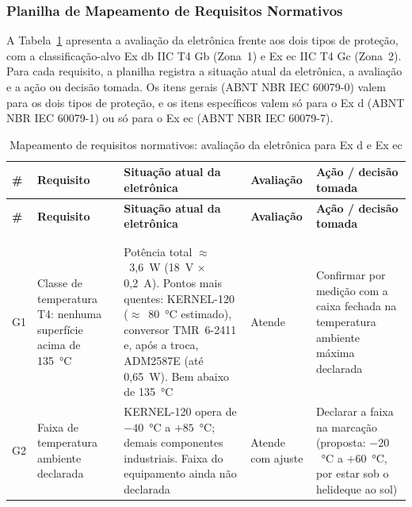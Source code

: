 \documentclass[a4paper, 12pt]{article}
\newcommand{\avA}{\cellcolor{green!20}Atende}
\newcommand{\avJ}{\cellcolor{yellow!30}Atende com ajuste}
\begin{document}
\subsubsection{Planilha de Mapeamento de Requisitos Normativos}\label{sec:planilha}

A Tabela~\ref{tab:gap} apresenta a avaliação da eletrônica frente aos dois tipos de proteção, com a classificação-alvo Ex db IIC T4 Gb (Zona~1) e Ex ec IIC T4 Gc (Zona~2). Para cada requisito, a planilha registra a situação atual da eletrônica, a avaliação e a ação ou decisão tomada. Os itens gerais (ABNT NBR IEC 60079-0) valem para os dois tipos de proteção, e os itens específicos valem só para o Ex d (ABNT NBR IEC 60079-1) ou só para o Ex ec (ABNT NBR IEC 60079-7).

{\footnotesize
\renewcommand{\arraystretch}{1.25}
\begin{longtable}{|>{\centering\arraybackslash}p{0.6cm}|>{\raggedright\arraybackslash}p{2.8cm}|>{\raggedright\arraybackslash}p{4.0cm}|>{\raggedright\arraybackslash}p{1.7cm}|>{\raggedright\arraybackslash}p{4.2cm}|}
    \caption{Mapeamento de requisitos normativos: avaliação da eletrônica para Ex d e Ex ec}\label{tab:gap}\\
    \hline
    \textbf{\#} & \centering\arraybackslash\textbf{Requisito} & \centering\arraybackslash\textbf{Situação atual da eletrônica} & \centering\arraybackslash\textbf{Avaliação} & \centering\arraybackslash\textbf{Ação / decisão tomada} \\ \hline
    \endfirsthead
    \hline
    \textbf{\#} & \centering\arraybackslash\textbf{Requisito} & \centering\arraybackslash\textbf{Situação atual da eletrônica} & \centering\arraybackslash\textbf{Avaliação} & \centering\arraybackslash\textbf{Ação / decisão tomada} \\ \hline
    \endhead
    \multicolumn{5}{r}{\textit{continua na próxima página}} \\
    \endfoot
    \endlastfoot
    \multicolumn{5}{|l|}{\textbf{Requisitos gerais (valem para Ex d e Ex ec) --- ABNT NBR IEC 60079-0}} \\ \hline
    G1 & Classe de temperatura T4: nenhuma superfície acima de 135~°C & Potência total $\approx$~3,6~W (18~V $\times$ 0,2~A). Pontos mais quentes: KERNEL-120 ($\approx$~80~°C estimado), conversor TMR~6-2411 e, após a troca, ADM2587E (até 0,65~W). Bem abaixo de 135~°C & \avA & Confirmar por medição com a caixa fechada na temperatura ambiente máxima declarada \\ \hline
    G2 & Faixa de temperatura ambiente declarada & KERNEL-120 opera de $-40$~°C a $+85$~°C; demais componentes industriais. Faixa do equipamento ainda não declarada & \avJ & Declarar a faixa na marcação (proposta: $-20$~°C a $+60$~°C, por estar sob o helideque ao sol) \\ \hline

\end{longtable}}
\end{document}
